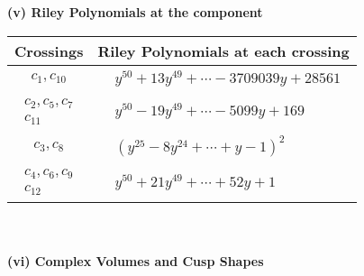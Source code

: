 \documentclass[1p]{elsarticle_modified}
\theoremstyle{definition}
\begin{document}
\newpage\renewcommand{\arraystretch}{1}
\flushleft \textbf{(v) Riley Polynomials at the component}\newline \\
\begin{tabular}{m{50pt}|m{274pt}}
Crossings & \hspace{64pt}Riley Polynomials at each crossing \\
\hline $$\begin{aligned}c_{1},c_{10}\end{aligned}$$&$\begin{aligned}
&y^{50}+13 y^{49}+\cdots-3709039 y+28561
\end{aligned}$\\
\hline $$\begin{aligned}c_{2},c_{5},c_{7}\\c_{11}\end{aligned}$$&$\begin{aligned}
&y^{50}-19 y^{49}+\cdots-5099 y+169
\end{aligned}$\\
\hline $$\begin{aligned}c_{3},c_{8}\end{aligned}$$&$\begin{aligned}
&(y^{25}-8 y^{24}+\cdots+y-1)^{2}
\end{aligned}$\\
\hline $$\begin{aligned}c_{4},c_{6},c_{9}\\c_{12}\end{aligned}$$&$\begin{aligned}
&y^{50}+21 y^{49}+\cdots+52 y+1
\end{aligned}$\\
\hline
\end{tabular}\\~\\
\newpage\flushleft \textbf{(vi) Complex Volumes and Cusp Shapes}
\end{document}
